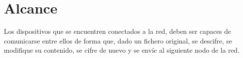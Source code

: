 \chapter{Alcance}
Los dispositivos que se encuentren conectados a la red, deben ser capaces de comunicarse entre ellos de forma que, dado un fichero original, se descifre, se modifique su contenido, se cifre de nuevo y se envíe al siguiente nodo de la red.